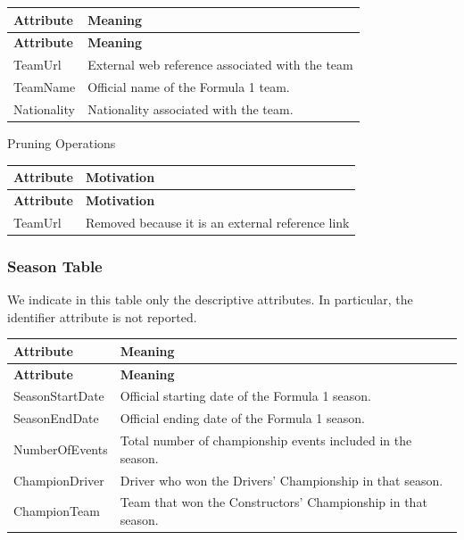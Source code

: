 \documentclass[a4paper,11pt]{article}
\begin{document}
	\begin{longtable}{|p{4cm}|p{10.8cm}|}
		\hline
		\textbf{Attribute} & \textbf{Meaning} \\
		\hline
		\endfirsthead
		
		\hline
		\textbf{Attribute} & \textbf{Meaning} \\
		\hline
		\endhead
		
		TeamUrl & External web reference associated with the team \\ \hline
		
		TeamName & Official name of the Formula 1 team. \\ \hline
		
		Nationality & Nationality associated with the team. \\ \hline
		
	\end{longtable}
	
	
	Pruning Operations
	
	\begin{longtable}{|p{4.4cm}|p{10.8cm}|}
		\hline
		\textbf{Attribute} & \textbf{Motivation} \\
		\hline
		\endfirsthead
		
		\hline
		\textbf{Attribute} & \textbf{Motivation} \\
		\hline
		\endhead
		
		TeamUrl & Removed because it is an external reference link \\ \hline
		
	\end{longtable}
	

	\subsubsection{Season Table}
	
	We indicate in this table only the descriptive attributes. In particular, the identifier attribute is not reported.
	
	\begin{longtable}{|p{4cm}|p{10.8cm}|}
		\hline
		\textbf{Attribute} & \textbf{Meaning} \\
		\hline
		\endfirsthead
		
		\hline
		\textbf{Attribute} & \textbf{Meaning} \\
		\hline
		\endhead
		
		SeasonStartDate & Official starting date of the Formula 1 season. \\ \hline
		
		SeasonEndDate & Official ending date of the Formula 1 season. \\ \hline
		
		NumberOfEvents & Total number of championship events included in the season. \\ \hline
		
		ChampionDriver & Driver who won the Drivers' Championship in that season. \\ \hline
		
		ChampionTeam & Team that won the Constructors' Championship in that season. \\ \hline
		
	\end{longtable}
	
\end{document}
